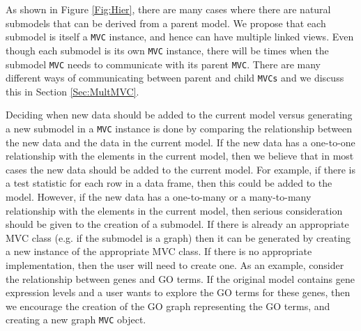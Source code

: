 \documentclass[11pt]{article}
\newcommand{\Robject}[1]{{\texttt{#1}}}
\begin{document}
As shown in Figure \ref{Fig:Hier}, there are many cases where there are
natural submodels that can be derived from a parent model.  We propose that
each submodel is itself a \Robject{MVC} instance, and hence can have multiple
linked views.  Even though each submodel is its own \Robject{MVC} instance,
there will be times when the submodel \Robject{MVC} needs to communicate with
its parent \Robject{MVC}.  There are many different ways of communicating
between parent and child \Robject{MVCs} and we discuss this in Section
\ref{Sec:MultMVC}.

Deciding when new data should be added to the current model versus generating
a new submodel in a \Robject{MVC} instance is done by comparing the
relationship between the new data and the data in the current model.  If the
new data has a one-to-one relationship with the elements in the current model,
then we believe that in most cases the new data should be added to the 
current model.  For example, if there is
a test statistic for each row in a data frame, then this could be added to the
model.  However, if the new data has a one-to-many or a many-to-many
relationship with the elements in the current model, then serious consideration should be given to the creation of a submodel.  If there is already an appropriate MVC class (e.g. if the submodel is a graph) then it can be
generated by creating a new instance of the appropriate MVC class.  If there
is no appropriate implementation, then the user will need to create one.  
As an example, consider the
relationship between genes and GO terms.  If the original model contains gene
expression levels and a user wants to explore the GO terms for these genes,
then we encourage the creation of the GO graph representing the GO terms,  and
creating a new graph \Robject{MVC} object.

\end{document}
